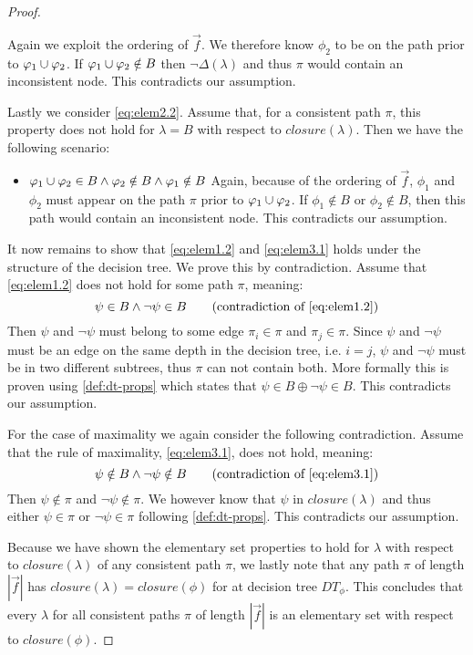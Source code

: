 \begin{proof}
\begin{itemize}
    Again we exploit the ordering of $\vec{f}$. We therefore know $\phi_2$ to be on the path prior to $\varphi_1 \cup \varphi_2$. If $\varphi_1 \cup \varphi_2 \notin B$ then $\lnot\Delta(\lambda)$ and thus $\pi$ would contain an inconsistent node. This contradicts our assumption.
\end{itemize}
Lastly we consider \autoref{eq:elem2.2}. Assume that, for a consistent path $\pi$, this property does not hold for $\lambda=B$ with respect to $closure(\lambda)$. Then we have the following scenario:
\begin{itemize}
    \item $\varphi_1 \cup \varphi_2 \in B \land \varphi_2 \notin B \land \varphi_1 \notin B$ \quad Again, because of the ordering of $\vec{f}$, $\phi_1$ and $\phi_2$ must appear on the path $\pi$ prior to $\varphi_1 \cup \varphi_2$. If $\phi_1 \notin B$ or $\phi_2 \notin B$, then this path would contain an inconsistent node. This contradicts our assumption.
\end{itemize}

It now remains to show that \autoref{eq:elem1.2} and \autoref{eq:elem3.1} holds under the structure of the decision tree. We prove this by contradiction. Assume that \autoref{eq:elem1.2} does not hold for some path $\pi$, meaning:
\begin{equation*}
    \psi \in B \land \lnot \psi \in B \tag{contradiction of \ref{eq:elem1.2}}
\end{equation*}
Then $\psi$ and $\lnot \psi$ must belong to some edge $\pi_i \in \pi$ and $\pi_j \in \pi$. Since $\psi$ and $\lnot\psi$ must be an edge on the same depth in the decision tree, i.e. $i=j$, $\psi$ and $\lnot \psi$ must be in two different subtrees, thus $\pi$ can not contain both. More formally this is proven using \autoref{def:dt-props} which states that $\psi \in B \oplus \lnot\psi \in B$. This contradicts our assumption.

For the case of maximality we again consider the following contradiction. Assume that the rule of maximality, \autoref{eq:elem3.1}, does not hold, meaning:
\begin{equation*}
    \psi \notin B \land \lnot \psi \notin B \tag{contradiction of \ref{eq:elem3.1}}
\end{equation*}
Then $\psi \notin \pi$ and $\lnot\psi \notin \pi$. We however know that $\psi$ in $closure(\lambda)$ and thus either $\psi \in \pi$ or $\lnot\psi \in \pi$ following \autoref{def:dt-props}. This contradicts our assumption.

Because we have shown the elementary set properties to hold for $\lambda$  with respect to $closure(\lambda)$ of any consistent path $\pi$, we lastly note that any path $\pi$ of length $|\vec{f}|$ has $closure(\lambda)=closure(\phi)$ for at decision tree $DT_\phi$. This concludes that every $\lambda$ for all consistent paths $\pi$ of length $|\vec{f}|$ is an elementary set with respect to $closure(\phi)$.
\end{proof}

